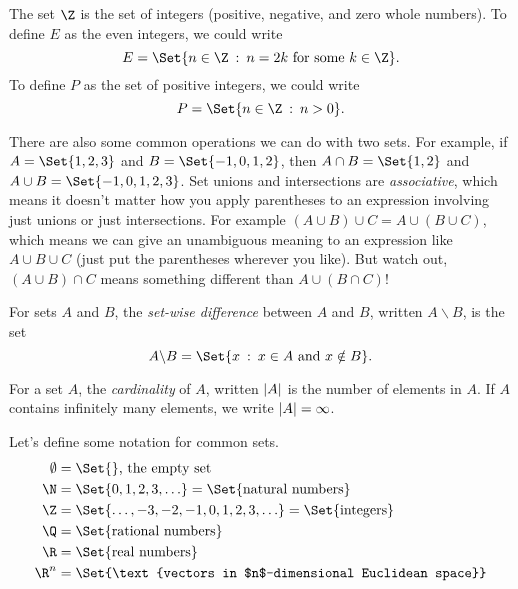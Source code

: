 	\begin{example}
		The set $\Z$ is the set of integers (positive, negative,
		and zero whole numbers).  To define $E$ as the even integers,
		we could write
		\[
			E=\Set{n\in \Z\given n=2k\text{ for some }k\in \Z}.
		\]
		To define $P$ as the set of positive integers, we could write
		\[
			P=\Set{n\in\Z\given n>0}.
		\]
	\end{example}


	There are also some common operations we can do with two sets.
	\DefUnionIntersection
	For example, if $A=\Set{1,2,3}$ and $B=\Set{-1,0,1,2}$, then $A\cap B=\Set{1,2}$ and $A\cup B=
	\Set{-1,0,1,2,3}$.  Set unions and intersections are \emph{associative}, which means it doesn't
	matter how you apply parentheses to an expression involving just unions or just intersections.
	For example $(A\cup B)\cup C=A\cup(B\cup C)$, which means
	we can give an unambiguous meaning to an expression like $A\cup B\cup C$ (just put
	the parentheses wherever you like).  But watch out, $(A\cup B)\cap C$ means something
	different than $A\cup(B\cap C)$!

	\begin{definition}
		For sets $A$ and $B$, the \emph{set-wise difference} between $A$ and $B$,
		written $A\backslash B$, is the set
		\[
			A\backslash B = \Set{x\given x\in A\text{ and }x\notin B}.
		\]
	\end{definition}
	\begin{definition}[Cardinality]
		For a set $A$, the \emph{cardinality} of $A$,
		written $\lvert A\rvert$ is the number of elements in $A$.  If $A$
		contains infinitely many elements, we write $\lvert A\rvert=\infty$.
	\end{definition}

	Let's define some notation for common sets.
	\begin{align*}
		\emptyset &= \Set{}\text{, the empty set}\\
		\N &= \Set{0,1,2,3,\ldots}=\Set{\text{natural numbers}}\\
		\Z &= \Set{\ldots, -3,-2,-1,0,1,2,3,\ldots}=\Set{\text{integers}}\\
		\Q &= \Set{\text{rational numbers}}\\
		\R &= \Set{\text{real numbers}}\\
		\R^n &= \Set{\text{vectors in $n$-dimensional Euclidean space}}\\
	\end{align*}

